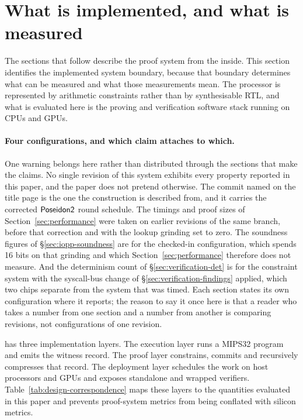 \section{What is implemented, and what is measured}
\label{sec:ipcore}

The sections that follow describe the proof system from the inside. This section identifies the implemented system boundary, because that boundary determines what can be measured and what those measurements mean. The processor is represented by arithmetic constraints rather than by synthesisable RTL, and what is evaluated here is the proving and verification software stack running on CPUs and GPUs.

\paragraph{Four configurations, and which claim attaches to which.} One
warning belongs here rather than distributed through the sections that make
the claims. No single revision of this system exhibits every property reported
in this paper, and the paper does not pretend otherwise. The commit named on
the title page is the one the construction is described from, and it carries
the corrected $\mathsf{Poseidon2}{}$ round schedule. The timings and proof sizes of
Section~\ref{sec:performance} were taken on earlier revisions of the same
branch, before that correction and with the lookup grinding set to zero. The
soundness figures of \S\ref{sec:iopp-soundness} are for the checked-in
configuration, which spends 16 bits on that grinding and which
Section~\ref{sec:performance} therefore does not measure. And the determinism
count of \S\ref{sec:verification-det} is for the constraint system with the
syscall-bus change of \S\ref{sec:verification-findings} applied, which two
chips separate from the system that was timed. Each section states its own
configuration where it reports; the reason to say it once here is that a
reader who takes a number from one section and a number from another is
comparing revisions, not configurations of one revision.

\Ziren{} has three implementation layers. The execution layer runs a MIPS32 program and emits the witness record. The proof layer constrains, commits and recursively compresses that record. The deployment layer schedules the work on host processors and GPUs and exposes standalone and wrapped verifiers. Table~\ref{tab:design-correspondence} maps these layers to the quantities evaluated in this paper and prevents proof-system metrics from being conflated with silicon metrics.

